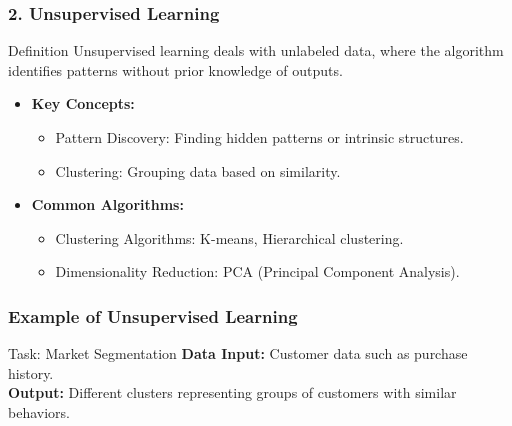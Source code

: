 \documentclass[aspectratio=169]{beamer}
\begin{document}
\begin{frame}[fragile]
    \frametitle{2. Unsupervised Learning}
    \begin{block}{Definition}
        Unsupervised learning deals with unlabeled data, where the algorithm identifies patterns without prior knowledge of outputs.
    \end{block}

    \begin{itemize}
        \item \textbf{Key Concepts:}
        \begin{itemize}
            \item Pattern Discovery: Finding hidden patterns or intrinsic structures.
            \item Clustering: Grouping data based on similarity.
        \end{itemize}
        
        \item \textbf{Common Algorithms:}
        \begin{itemize}
            \item Clustering Algorithms: K-means, Hierarchical clustering.
            \item Dimensionality Reduction: PCA (Principal Component Analysis).
        \end{itemize}
    \end{itemize}
\end{frame}

\begin{frame}[fragile]
    \frametitle{Example of Unsupervised Learning}
    \begin{block}{Task: Market Segmentation}
        \textbf{Data Input:} Customer data such as purchase history.\\
        \textbf{Output:} Different clusters representing groups of customers with similar behaviors.
    \end{block}
\end{frame}
\end{document}
